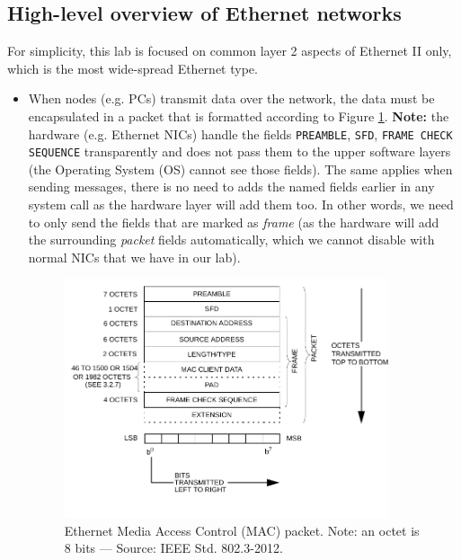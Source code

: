 \documentclass[pdftex,12pt,a4paper]{article}
\begin{document}
        \subsection{High-level overview of Ethernet networks}
            For simplicity, this lab is focused on common layer 2 aspects of
            Ethernet II only, which is the most wide-spread Ethernet type.
            \begin{itemize}
                \item When nodes (e.g. PCs) transmit data over the network, the
                data must be encapsulated in a packet that is formatted
                according to Figure \ref{fig:macpacket}. \textbf{Note:} the
                hardware (e.g. Ethernet NICs) handle the fields
                \texttt{PREAMBLE}, \texttt{SFD}, \texttt{FRAME CHECK SEQUENCE}
                transparently and does not pass them to the upper software
                layers (the Operating System (OS) cannot see those fields). The
                same applies when sending messages, there is no need to adds
                the named fields earlier in any system call as the hardware
                layer will add them too. In other words, we need to only send
                the fields that are marked as \emph{frame} (as the hardware
                will add the surrounding \emph{packet} fields automatically,
                which we cannot disable with normal NICs that we have in our
                lab).

                \begin{figure}[tbh]
                    \centering
                    \includegraphics[width=0.9\textwidth]{figures/macpacket}
                    \caption{Ethernet Media Access Control (MAC) packet. Note:
                    an octet is 8 bits --- Source: IEEE Std. 802.3-2012.}
                    \label{fig:macpacket}
                \end{figure}


\end{itemize}
\end{document}
